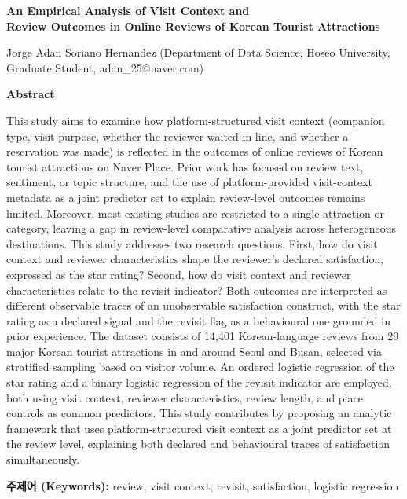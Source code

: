 \documentclass[10pt,a4paper]{article}
\begin{document}
\newpage

\begin{center}
{\Large\textbf{An Empirical Analysis of Visit Context and\\[2pt]
Review Outcomes in Online Reviews of Korean Tourist Attractions}}

\vspace{12pt}

{\normalsize *Jorge Adan Soriano Hernandez (Department of Data Science,
Hoseo University, Graduate Student, adan\_25@naver.com)}

\end{center}

\vspace{10pt}

\noindent\textbf{\large Abstract}

\vspace{4pt}

\noindent
This study aims to examine how platform-structured visit context (companion
type, visit purpose, whether the reviewer waited in line, and whether a
reservation was made) is reflected in the outcomes of online reviews of
Korean tourist attractions on Naver Place. Prior work has focused on review
text, sentiment, or topic structure, and the use of platform-provided
visit-context metadata as a joint predictor set to explain review-level
outcomes remains limited. Moreover, most existing studies are restricted to
a single attraction or category, leaving a gap in review-level comparative
analysis across heterogeneous destinations. This study addresses two
research questions. First, how do visit context and reviewer characteristics
shape the reviewer's declared satisfaction, expressed as the star rating?
Second, how do visit context and reviewer characteristics relate to the
revisit indicator? Both outcomes are interpreted as different observable
traces of an unobservable satisfaction construct, with the star rating as a
declared signal and the revisit flag as a behavioural one grounded in
prior experience. The dataset consists of 14{,}401 Korean-language reviews
from 29 major Korean tourist attractions in and around Seoul and Busan,
selected via stratified sampling based on visitor volume. An ordered
logistic regression of the star rating and a binary logistic regression of
the revisit indicator are employed, both using visit context, reviewer
characteristics, review length, and place controls as common predictors.
This study contributes by proposing an analytic framework that uses
platform-structured visit context as a joint predictor set at the review
level, explaining both declared and behavioural traces of satisfaction
simultaneously.

\vspace{6pt}

\noindent\textbf{주제어 (Keywords):} review, visit context, revisit,
satisfaction, logistic regression
\end{document}
